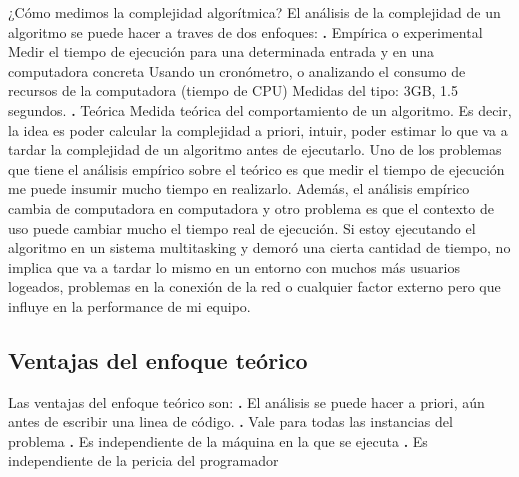 \documentclass[10pt,a4paper]{article}
\begin{document}
¿Cómo medimos la complejidad algorítmica? El análisis de la complejidad de un algoritmo se puede hacer a traves de dos enfoques:
\newline
\newline
\textbf{.} Empírica o experimental
\newline
\newline
Medir el tiempo de ejecución para una determinada entrada y en una computadora concreta
\newline
\newline
Usando un cronómetro, o analizando el consumo de recursos de la computadora (tiempo de CPU)
\newline
\newline
Medidas del tipo: 3GB, 1.5 segundos.
\newline
\newline
\textbf{.} Teórica
\newline
\newline
Medida teórica del comportamiento de un algoritmo. Es decir, la idea es poder calcular la complejidad a priori, intuir, poder estimar lo que va a tardar la complejidad de un algoritmo antes de ejecutarlo.
\newline
\newline
Uno de los problemas que tiene el análisis empírico sobre el teórico es que medir el tiempo de ejecución me puede insumir mucho tiempo en realizarlo. Además, el análisis empírico cambia de computadora en computadora y otro problema es que el contexto de uso puede cambiar mucho el tiempo real de ejecución. Si estoy ejecutando el algoritmo en un sistema multitasking y demoró una cierta cantidad de tiempo, no implica que va a tardar lo mismo en un entorno con muchos más usuarios logeados, problemas en la conexión de la red o cualquier factor externo pero que influye en la performance de mi equipo.

\subsection{Ventajas del enfoque teórico}

Las ventajas del enfoque teórico son:
\newline
\newline
\textbf{.} El análisis se puede hacer a priori, aún antes de escribir una linea de código.
\newline
\newline
\textbf{.} Vale para todas las instancias del problema
\newline
\newline
\textbf{.} Es independiente de la máquina en la que se ejecuta
\newline
\newline
\textbf{.} Es independiente de la pericia del programador
\newpage
\end{document}
